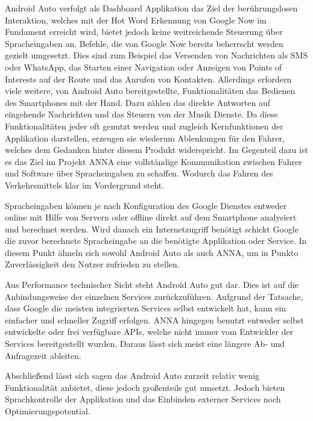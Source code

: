 Android Auto verfolgt als Dashboard Applikation das Ziel der berührungslosen Interaktion, welches mit der Hot Word Erkennung von Google Now im Fundament erreicht wird, bietet jedoch keine weitreichende Steuerung über Spracheingaben an. Befehle, die von Google Now bereits beherrscht werden gezielt umgesetzt. Dies sind zum Beispiel das Versenden von Nachrichten als SMS oder WhatsApp, das Starten einer Navigation oder Anzeigen von Points of Interests auf der Route und das Anrufen von Kontakten. Allerdings erfordern viele weitere, von Android Auto bereitgestellte, Funktionalitäten das Bedienen des Smartphones mit der Hand. Dazu zählen das direkte Antworten auf eingehende Nachrichten und das Steuern von der Musik Dienste. Da diese Funktionalitäten jeder oft genutzt werden und zugleich Kernfunktionen der Applikation darstellen, erzeugen sie wiederum Ablenkungen für den Fahrer, welches dem Gedanken hinter diesem Produkt widerspricht. Im Gegenteil dazu ist es das Ziel im Projekt \ac{ANNA} eine vollständige Kommunikation zwischen Fahrer und Software über Spracheingaben zu schaffen. Wodurch das Fahren des Verkehrsmittels klar im Vordergrund steht. 

Spracheingaben können je nach Konfiguration des Google Dienstes entweder online mit Hilfe von Servern oder offline direkt auf dem Smartphone analysiert und berechnet werden. Wird danach ein Internetzugriff benötigt schickt Google die zuvor berechnete Spracheingabe an die benötigte Applikation oder Service. In diesem Punkt ähneln sich sowohl Android Auto als auch \ac{ANNA}, um in Punkto Zuverlässigkeit den Nutzer zufrieden zu stellen. 

Aus Performance technischer Sicht steht Android Auto gut dar. Dies ist auf die Anbindungsweise der einzelnen Services zurückzuführen. Aufgrund der Tatsache, dass Google die meisten integrierten Services selbst entwickelt hat, kann ein einfacher und schneller Zugriff erfolgen. \ac{ANNA} hingegen benutzt entweder selbst entwickelte oder frei verfügbare \ac{API}s, welche nicht immer vom Entwickler der Services bereitgestellt wurden. Daraus lässt sich meist eine längere Ab- und Anfragezeit ableiten.

Abschließend lässt sich sagen das Android Auto zurzeit relativ wenig Funktionalität anbietet, diese jedoch großenteils gut umsetzt. Jedoch bieten Sprachkontrolle der Applikation und das Einbinden externer Services noch Optimierungspotential.
